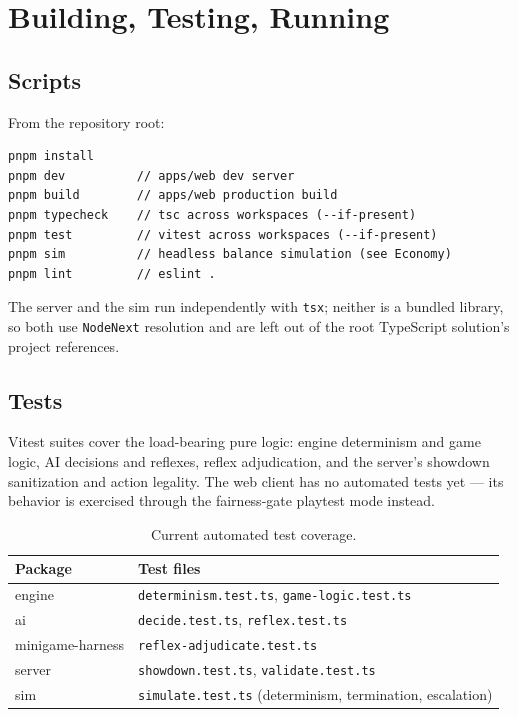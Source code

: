 \documentclass[11pt,a4paper]{article}
\newcommand{\code}[1]{\texttt{#1}}
\begin{document}
\section{Building, Testing, Running}

\subsection{Scripts}
From the repository root:
\begin{lstlisting}
pnpm install
pnpm dev          // apps/web dev server
pnpm build        // apps/web production build
pnpm typecheck    // tsc across workspaces (--if-present)
pnpm test         // vitest across workspaces (--if-present)
pnpm sim          // headless balance simulation (see Economy)
pnpm lint         // eslint .
\end{lstlisting}
The server and the sim run independently with \code{tsx}; neither is a bundled
library, so both use \code{NodeNext} resolution and are left out of the root
TypeScript solution's project references.

\subsection{Tests}
Vitest suites cover the load-bearing pure logic: engine determinism and game
logic, AI decisions and reflexes, reflex adjudication, and the server's showdown
sanitization and action legality. The web client has no automated tests yet ---
its behavior is exercised through the fairness-gate playtest mode instead.

\begin{table}[h]
\centering
\small
\begin{tabular}{@{}ll@{}}
\toprule
\textbf{Package} & \textbf{Test files} \\
\midrule
engine            & \code{determinism.test.ts}, \code{game-logic.test.ts} \\
ai                & \code{decide.test.ts}, \code{reflex.test.ts} \\
minigame-harness  & \code{reflex-adjudicate.test.ts} \\
server            & \code{showdown.test.ts}, \code{validate.test.ts} \\
sim               & \code{simulate.test.ts} (determinism, termination, escalation) \\
\bottomrule
\end{tabular}
\caption{Current automated test coverage.}
\end{table}
\end{document}
